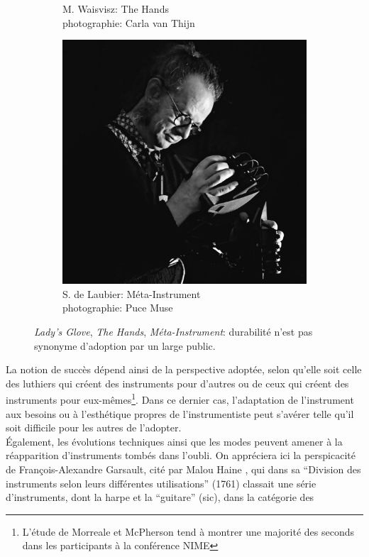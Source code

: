 \begin{figure}[!htbp]
{\begin{subfigure}[b]{.35\textwidth}
			\caption[Michel Waisvisz et The Hands v2]{M. Waisvisz: The Hands\\ photographie: Carla van Thijn}
			\label{fig:ephemeral:Waisvisz_TheHands}
		\end{subfigure}%
		\begin{subfigure}[b]{.35\textwidth}
			\centering
			\includegraphics[width=.98\textwidth]{gfx/02_ephemeral/DeLaubier-MI4.jpg}
			\caption[Serge de Laubier et le Méta-Instrument 4]{S. de Laubier: Méta-Instrument\\ photographie: Puce Muse}
			\label{fig:ephemeral:DeLaubier_MI4}
		\end{subfigure}%
	}
	\caption[Lady's Glove, The Hands, Méta-Instrument: durabilité n'est pas synonyme d'adoption]{\textit{Lady's Glove}, \textit{The Hands}, \textit{Méta-Instrument}: durabilité n'est pas synonyme d'adoption par un large public.}
\end{figure}
\indent La notion de succès dépend ainsi de la perspective adoptée, selon qu'elle soit celle des luthiers qui créent des instruments pour d'autres ou de ceux qui créent des instruments pour eux-mêmes\footnote{L'étude de Morreale et McPherson \cite{morreale_design_2017} tend à montrer une majorité des seconds dans les participants à la conférence \gls{NIME}}. Dans ce dernier cas, l'adaptation de l'instrument aux besoins ou à l'esthétique propres de l'instrumentiste peut s'avérer telle qu'il soit difficile pour les autres de l'adopter.\\
\indent Également, les évolutions techniques ainsi que les modes peuvent amener à la réapparition d'instruments tombés dans l'oubli. On appréciera ici la perspicacité de François-Alexandre Garsault, cité par Malou Haine \cite{haine_les_2018}, qui dans sa ``Division des instruments selon leurs différentes utilisations'' (1761) classait une série d'instruments, dont la harpe et la ``guitare'' (sic), dans la catégorie des 



